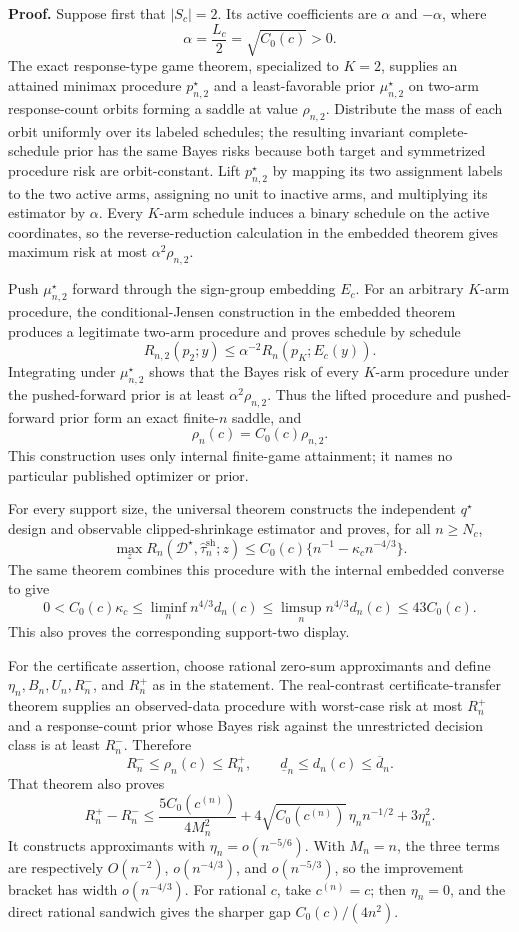 \textbf{Proof.}
Suppose first that \(|S_c|=2\). Its active coefficients are \(\alpha\) and \(-\alpha\), where
\[
 \alpha=\frac{L_c}{2}=\sqrt{C_0(c)}>0.
\]
The exact response-type game theorem, specialized to \(K=2\), supplies an attained minimax procedure \(p_{n,2}^\star\) and a least-favorable prior \(\mu_{n,2}^\star\) on two-arm response-count orbits forming a saddle at value \(\rho_{n,2}\). Distribute the mass of each orbit uniformly over its labeled schedules; the resulting invariant complete-schedule prior has the same Bayes risks because both target and symmetrized procedure risk are orbit-constant. Lift \(p_{n,2}^\star\) by mapping its two assignment labels to the two active arms, assigning no unit to inactive arms, and multiplying its estimator by \(\alpha\). Every \(K\)-arm schedule induces a binary schedule on the active coordinates, so the reverse-reduction calculation in the embedded theorem gives maximum risk at most \(\alpha^2\rho_{n,2}\).

Push \(\mu_{n,2}^\star\) forward through the sign-group embedding \(E_c\). For an arbitrary \(K\)-arm procedure, the conditional-Jensen construction in the embedded theorem produces a legitimate two-arm procedure and proves schedule by schedule
\[
 R_{n,2}(p_2;y)\leq\alpha^{-2}R_n(p_K;E_c(y)).
\]
Integrating under \(\mu_{n,2}^\star\) shows that the Bayes risk of every \(K\)-arm procedure under the pushed-forward prior is at least \(\alpha^2\rho_{n,2}\). Thus the lifted procedure and pushed-forward prior form an exact finite-\(n\) saddle, and
\[
 \rho_n(c)=C_0(c)\rho_{n,2}.
\]
This construction uses only internal finite-game attainment; it names no particular published optimizer or prior.

For every support size, the universal theorem constructs the independent \(q^\star\) design and observable clipped-shrinkage estimator and proves, for all \(n\geq N_c\),
\[
 \max_zR_n(\mathcal D^\star,\widehat\tau_n^{\mathrm{sh}};z)
 \leq C_0(c)\{n^{-1}-\kappa_cn^{-4/3}\}.
\]
The same theorem combines this procedure with the internal embedded converse to give
\[
 0<C_0(c)\kappa_c
 \leq\liminf_n n^{4/3}d_n(c)
 \leq\limsup_n n^{4/3}d_n(c)
 \leq43C_0(c).
\]
This also proves the corresponding support-two display.

For the certificate assertion, choose rational zero-sum approximants and define \(\eta_n,B_n,U_n,R_n^-\), and \(R_n^+\) as in the statement. The real-contrast certificate-transfer theorem supplies an observed-data procedure with worst-case risk at most \(R_n^+\) and a response-count prior whose Bayes risk against the unrestricted decision class is at least \(R_n^-\). Therefore
\[
 R_n^-\leq\rho_n(c)\leq R_n^+,
 \qquad
 \underline d_n\leq d_n(c)\leq\overline d_n.
\]
That theorem also proves
\[
 R_n^+-R_n^-
 \leq\frac{5C_0(c^{(n)})}{4M_n^2}
 +4\sqrt{C_0(c^{(n)})}\,\eta_nn^{-1/2}+3\eta_n^2.
\]
It constructs approximants with \(\eta_n=o(n^{-5/6})\). With \(M_n=n\), the three terms are respectively \(O(n^{-2})\), \(o(n^{-4/3})\), and \(o(n^{-5/3})\), so the improvement bracket has width \(o(n^{-4/3})\). For rational \(c\), take \(c^{(n)}=c\); then \(\eta_n=0\), and the direct rational sandwich gives the sharper gap \(C_0(c)/(4n^2)\).

